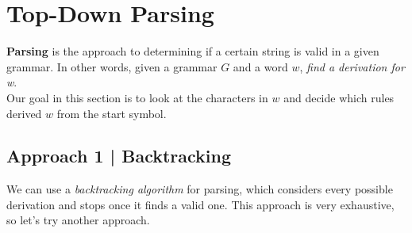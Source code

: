 \documentclass{report}
\begin{document}
\section{Top-Down Parsing}
\textbf{Parsing} is the approach to determining if a certain string is valid in a given grammar. In other words, given a grammar $G$ and a word $w$, \textit{find a derivation for w}.\\
Our goal in this section is to look at the characters in $w$ and decide which rules derived $w$ from the start symbol.
\subsection{Approach 1 | Backtracking}
We can use a \textit{backtracking algorithm} for parsing, which considers every possible derivation and stops once it finds a valid one. This approach is very exhaustive, so let's try another approach.
\end{document}
